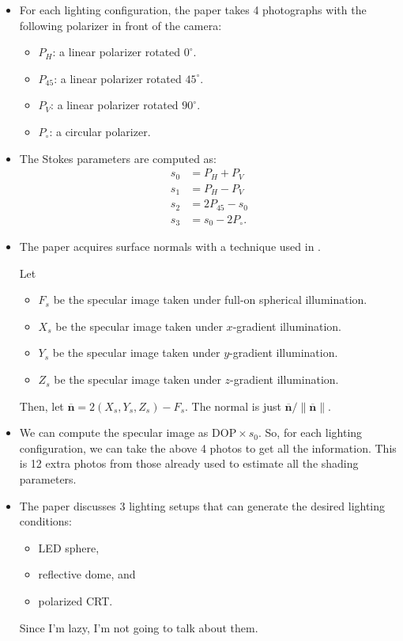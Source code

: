 \documentclass[10pt]{article}
\newcommand{\ve}[1]{\mathbf{#1}}
\begin{document}
    \begin{itemize}
      \item For each lighting configuration, the paper takes 4 photographs with the following polarizer in front of the camera:
      \begin{itemize}
        \item $P_H$: a linear polarizer rotated $0^\circ$.
        \item $P_{45}$: a linear polarizer rotated $45^\circ$.
        \item $P_V$: a linear polarizer rotated $90^\circ$.
        \item $P_\circ$: a circular polarizer.
      \end{itemize}

      \item The Stokes parameters are computed as:
      \begin{align*}
        s_0 &= P_H + P_V \\
        s_1 &= P_H - P_V \\
        s_2 &= 2P_{45} - s_0 \\
        s_3 &= s_0 - 2P_\circ.
      \end{align*}

      \item The paper acquires surface normals with a technique used in \cite{Ma:2007}.

      Let
      \begin{itemize}
        \item $F_s$ be the specular image taken under full-on spherical illumination.
        \item $X_s$ be the specular image taken under $x$-gradient illumination.
        \item $Y_s$ be the specular image taken under $y$-gradient illumination.
        \item $Z_s$ be the specular image taken under $z$-gradient illumination.
      \end{itemize}
      Then, let $\overline{\ve{n}} = 2(X_s, Y_s, Z_s) - F_s$.  The normal is just $\overline{\ve{n}} / \| \overline{\ve{n}} \|$.

      \item We can compute the specular image as $\mathrm{DOP} \times s_0$.  So, for each lighting configuration, we can take the above 4 photos to get all the information.  This is 12 extra photos from those already used to estimate all the shading parameters.

      \item The paper discusses 3 lighting setups that can generate the desired lighting conditions:
      \begin{itemize}
        \item LED sphere,
        \item reflective dome, and
        \item polarized CRT.
      \end{itemize}
      Since I'm lazy, I'm not going to talk about them.
    \end{itemize}

	
	  
\end{document}
